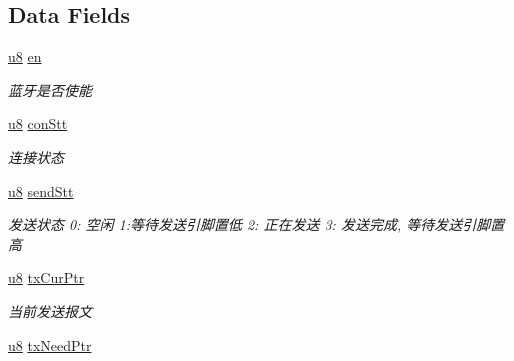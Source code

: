 \subsection*{\-Data \-Fields}
\begin{DoxyCompactItemize}
\item 
\hypertarget{struct_s_t_r___ble_a543c992269af2f3a9483997edec0658b}{\hyperlink{group___b_s_p_gaed742c436da53c1080638ce6ef7d13de}{u8} \hyperlink{struct_s_t_r___ble_a543c992269af2f3a9483997edec0658b}{en}}\label{struct_s_t_r___ble_a543c992269af2f3a9483997edec0658b}

\begin{DoxyCompactList}\small\item\em 蓝牙是否使能 \end{DoxyCompactList}\item 
\hypertarget{struct_s_t_r___ble_a8fad178d0a840fbb54d7a37eb4083356}{\hyperlink{group___b_s_p_gaed742c436da53c1080638ce6ef7d13de}{u8} \hyperlink{struct_s_t_r___ble_a8fad178d0a840fbb54d7a37eb4083356}{con\-Stt}}\label{struct_s_t_r___ble_a8fad178d0a840fbb54d7a37eb4083356}

\begin{DoxyCompactList}\small\item\em 连接状态 \end{DoxyCompactList}\item 
\hypertarget{struct_s_t_r___ble_ad7dbb51ab95ad5dfa8709bbba94d79b5}{\hyperlink{group___b_s_p_gaed742c436da53c1080638ce6ef7d13de}{u8} \hyperlink{struct_s_t_r___ble_ad7dbb51ab95ad5dfa8709bbba94d79b5}{send\-Stt}}\label{struct_s_t_r___ble_ad7dbb51ab95ad5dfa8709bbba94d79b5}

\begin{DoxyCompactList}\small\item\em 发送状态 0\-: 空闲 1\-:等待发送引脚置低 2\-: 正在发送 3\-: 发送完成, 等待发送引脚置高 \end{DoxyCompactList}\item 
\hypertarget{struct_s_t_r___ble_a67d320b424fbcf9097a3f10c06b8ddf7}{\hyperlink{group___b_s_p_gaed742c436da53c1080638ce6ef7d13de}{u8} \hyperlink{struct_s_t_r___ble_a67d320b424fbcf9097a3f10c06b8ddf7}{tx\-Cur\-Ptr}}\label{struct_s_t_r___ble_a67d320b424fbcf9097a3f10c06b8ddf7}

\begin{DoxyCompactList}\small\item\em 当前发送报文 \end{DoxyCompactList}\item 
\hypertarget{struct_s_t_r___ble_a22eb8d28b5148f2cc277566378919bfb}{\hyperlink{group___b_s_p_gaed742c436da53c1080638ce6ef7d13de}{u8} \hyperlink{struct_s_t_r___ble_a22eb8d28b5148f2cc277566378919bfb}{tx\-Need\-Ptr}}\label{struct_s_t_r___ble_a22eb8d28b5148f2cc277566378919bfb}


\end{DoxyCompactItemize}

